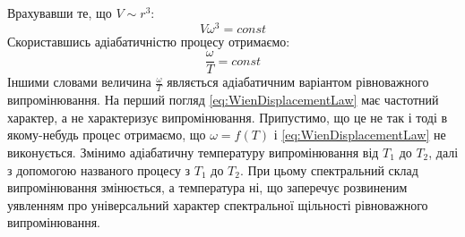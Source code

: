 \documentclass{article}
\begin{document}
Врахувавши те, що $V \sim r^{3}$:
\begin{equation}
    \label{eq:Consider_to_V_Approximation}
    V \omega^{3} = const
\end{equation}
Скориставшись адіабатичністю процесу отримаємо:
\begin{equation}
    \label{eq:WienDisplacementLaw}
    \frac{\omega}{T} = const
\end{equation}
Іншими словами величина $\frac{\omega}{T}$ являється адіабатичним варіантом рівноважного випромінювання. На перший погляд \eqref{eq:WienDisplacementLaw} має частотний характер, а не характеризує випромінювання. Припустимо, що 
це не так і тоді в якому-небудь процес отримаємо, що $\omega = f(T)$ і \eqref{eq:WienDisplacementLaw} не виконується. Змінимо адіабатичну температуру випромінювання від $T_{1}$ до $T_{2}$, далі з допомогою названого процесу 
з $T_{1}$ до $T_{2}$. При цьому спектральний склад випромінювання змінюється, а температура ні, що заперечує розвиненим уявленням про універсальний характер спектральної щільності рівноважного випромінювання. 
\end{document}
